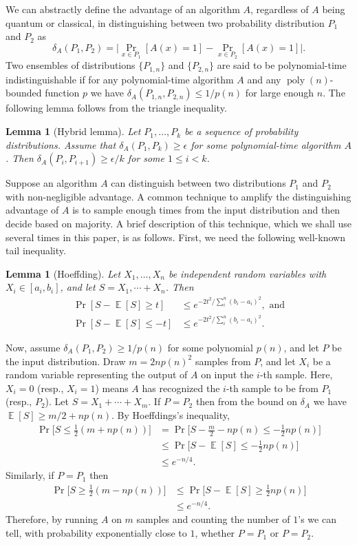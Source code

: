 \documentclass[11pt]{article}
\theoremstyle{plain}
\newtheorem{lemma}[theorem]{Lemma}
\theoremstyle{definition}
\DeclareMathOperator{\poly}{poly}
\DeclareMathOperator{\E}{\mathbb{E}}
\begin{document}
We can abstractly define the advantage of an algorithm $A$, regardless of $A$ being quantum or classical, in distinguishing between two probability distribution $P_1$ and $P_2$ as
\[ \delta_A(P_1, P_2) = \Big| \Pr_{x \in P_1}[A(x) = 1] - \Pr_{x \in P_2}[A(x) = 1] \Big|. \]
Two ensembles of distributions $\{ P_{1, n} \}$ and $\{ P_{2, n} \}$ are said to be polynomial-time indistinguishable if for any polynomial-time algorithm $A$ and any $\poly(n)$-bounded function $p$ we have $\delta_A(P_{1, n}, P_{2, n}) \le 1 / p(n)$ for large enough $n$. The following lemma follows from the triangle inequality.
\begin{lemma}[Hybrid lemma]
    \label{lem:hybrid}
    Let $P_1, \dots, P_k$ be a sequence of probability distributions. Assume that $\delta_A(P_1, P_k) \ge \epsilon$ for some polynomial-time algorithm $A$. Then $\delta_A(P_i, P_{i + 1}) \ge \epsilon / k$ for some $1 \le i < k$.
\end{lemma}
Suppose an algorithm $A$ can distinguish between two distributions $P_1$ and $P_2$ with non-negligible advantage. A common technique to amplify the distinguishing advantage of $A$ is to sample enough times from the input distribution and then decide based on majority. A brief description of this technique, which we shall use several times in this paper, is as follows. First, we need the following well-known tail inequality.
\begin{lemma}[Hoeffding]
    Let $X_1, \dots, X_n$ be independent random variables with $X_i \in [a_i, b_i]$, and let $S = X_1, \cdots + X_n$. Then
    \begin{align*}
        \Pr[S - \E[S] \ge t] & \le e^{-2t^2 / \sum_i^n (b_i - a_i)^2}, \text{ and} \\
        \Pr[S - \E[S] \le -t] & \le e^{-2t^2 / \sum_i^n (b_i - a_i)^2}.
    \end{align*}
\end{lemma}
Now, assume $\delta_A(P_1, P_2) \ge 1 / p(n)$ for some polynomial $p(n)$, and let $P$ be the input distribution. Draw $m = 2np(n)^2$ samples from $P$, and let $X_i$ be a random variable representing the output of $A$ on input the $i$-th sample. Here, $X_i = 0$ (resp., $X_i = 1$) means $A$ has recognized the $i$-th sample to be from $P_1$ (resp., $P_2$). Let $S = X_1 + \cdots + X_m$. If $P = P_2$ then from the bound on $\delta_A$ we have $\E[S] \ge m / 2 + np(n)$. By Hoeffdings's inequality,
\begin{align*}
    \Pr\Big[ S \le \frac{1}{2} (m + np(n)) \Big]
    & = \Pr\Big[ S - \frac{m}{2} - np(n) \le -\frac{1}{2}np(n) \Big] \\
    & \le \Pr\Big[ S - \E[S] \le -\frac{1}{2}np(n) \Big] \\
    & \le e^{-n / 4}.
\end{align*}
Similarly, if $P = P_1$ then
\begin{align*}
    \Pr\Big[ S \ge \frac{1}{2} (m - np(n)) \Big]
    & \le \Pr\Big[ S - \E[S] \ge \frac{1}{2}np(n) \Big] \\
    & \le e^{-n / 4}.
\end{align*}
Therefore, by running $A$ on $m$ samples and counting the number of $1$'s we can tell, with probability exponentially close to $1$, whether $P = P_1$ or $P = P_2$.
\end{document}
